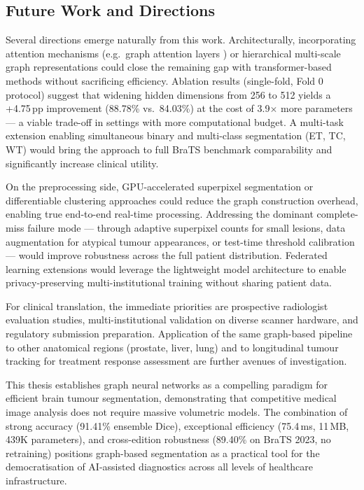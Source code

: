 \documentclass{article}
\begin{document}
\subsection{Future Work and Directions}

Several directions emerge naturally from this work. Architecturally, incorporating attention mechanisms (e.g.\ graph attention layers \cite{velickovic2018gat}) or hierarchical multi-scale graph representations could close the remaining gap with transformer-based methods without sacrificing efficiency. Ablation results (single-fold, Fold 0 protocol) suggest that widening hidden dimensions from 256 to 512 yields a +4.75\,pp improvement (88.78\% vs.\ 84.03\%) at the cost of 3.9$\times$ more parameters — a viable trade-off in settings with more computational budget. A multi-task extension enabling simultaneous binary and multi-class segmentation (ET, TC, WT) would bring the approach to full BraTS benchmark comparability and significantly increase clinical utility.

On the preprocessing side, GPU-accelerated superpixel segmentation or differentiable clustering approaches could reduce the graph construction overhead, enabling true end-to-end real-time processing. Addressing the dominant complete-miss failure mode — through adaptive superpixel counts for small lesions, data augmentation for atypical tumour appearances, or test-time threshold calibration — would improve robustness across the full patient distribution. Federated learning extensions would leverage the lightweight model architecture to enable privacy-preserving multi-institutional training without sharing patient data.

For clinical translation, the immediate priorities are prospective radiologist evaluation studies, multi-institutional validation on diverse scanner hardware, and regulatory submission preparation. Application of the same graph-based pipeline to other anatomical regions (prostate, liver, lung) and to longitudinal tumour tracking for treatment response assessment are further avenues of investigation.

This thesis establishes graph neural networks as a compelling paradigm for efficient brain tumour segmentation, demonstrating that competitive medical image analysis does not require massive volumetric models. The combination of strong accuracy (91.41\% ensemble Dice), exceptional efficiency (75.4\,ms, 11\,MB, 439K parameters), and cross-edition robustness (89.40\% on BraTS 2023, no retraining) positions graph-based segmentation as a practical tool for the democratisation of AI-assisted diagnostics across all levels of healthcare infrastructure.

\cleardoublepage

\cleardoublepage


\end{document}

